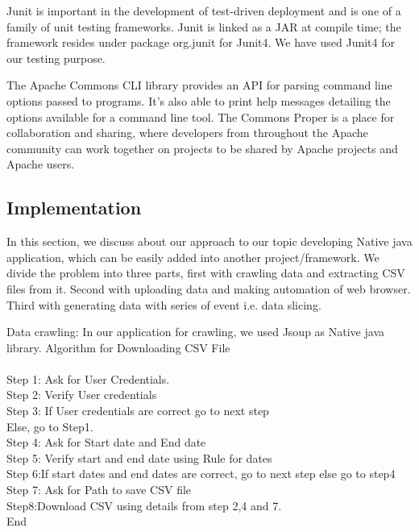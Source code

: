 \documentclass[12pt]{report}
\begin{document}
Junit is important in the development of test-driven deployment and is one of a family of unit testing frameworks. Junit is linked as a JAR at compile time; the framework resides under package org.junit for Junit4. We have used Junit4 for our testing purpose.

The Apache Commons CLI library provides an API for parsing command line options passed to programs. It's also able to print help messages detailing the options available for a command line tool. The Commons Proper is a place for collaboration and sharing, where developers from throughout the Apache community can work together on projects to be shared by Apache projects and Apache users.

\subsection*{Implementation}
In this section, we discuss about our approach to our topic developing Native java application, which can be easily added into another project/framework. We divide the problem into three parts, first with crawling data and extracting CSV files from it. Second with uploading data and making automation of web browser. Third with generating data with series of event i.e. data slicing.

Data crawling:
In our application for crawling, we used Jsoup as Native java library. Algorithm for Downloading CSV File\\
\\
	Step 1: Ask for User Credentials.\\
	Step 2: Verify User credentials\\
	Step 3: If User credentials are correct go to next step\\
			Else, go to Step1.\\
	Step 4: Ask for Start date and End date\\
	Step 5: Verify start and end date using Rule for dates\\
	Step 6:If start dates and end dates are correct, go to next step else go to step4\\
	Step 7: Ask for Path to save CSV file\\
Step8:Download CSV using details from step 2,4 and 7.\\
		End
\\
\end{document}
